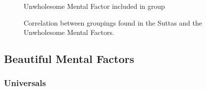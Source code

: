 \begin{figure}[H]
\begin{center}
\tm\hspace{2mm} Unwholesome Mental Factor included in group
\end{center}

\caption{Correlation between groupings found in the Suttas and the Unwholesome Mental Factors.}
\end{figure}

\subsection*{Beautiful Mental Factors}

\subsubsection*{Universals}

